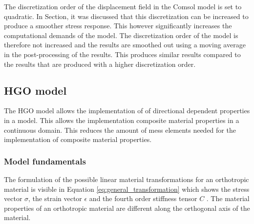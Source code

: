\qquad The discretization order of the displacement field in the Comsol model is set to quadratic. In Section, it was discussed that this discretization can be increased to produce a smoother stress response. This however significantly increases the computational demands of the model. The discretization order of the model is therefore not increased and the results are smoothed out using a moving average in the post-processing of the results. This produces similar results compared to the results that are produced with a higher discretization order.\\


\subsection{HGO model}\label{sec:HGO_model}
The HGO model allows the implementation of of directional dependent properties in a model. This allows the implementation composite material properties in a continuous domain. This reduces the amount of mess elements needed for the implementation of composite material properties.

\subsubsection{Model fundamentals}\label{sec:HGO_model_fundamentals}
The formulation of the possible linear material transformations for an orthotropic material is visible in Equation \ref{eq:general_transformation} which shows the stress vector $\sigma$, the strain vector $\epsilon$ and the fourth order stiffness tensor $C$ \cite{freutel2014finite}. The material properties of an orthotropic material are different along the orthogonal axis of the material.\\ 

